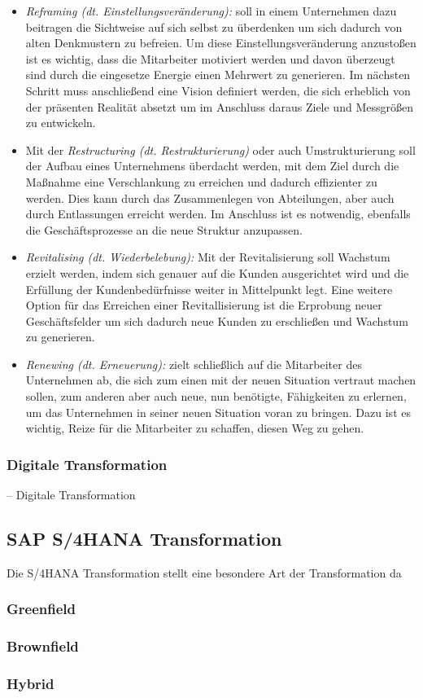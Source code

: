 \begin{itemize}
    \item[] \emph{Reframing (dt. Einstellungsveränderung):} soll in einem Unternehmen dazu beitragen die Sichtweise auf sich selbst zu überdenken um sich dadurch von alten Denkmustern zu befreien. Um diese Einstellungsveränderung anzustoßen ist es wichtig, dass die Mitarbeiter motiviert werden und davon überzeugt sind durch die eingesetze Energie einen Mehrwert zu generieren. Im nächsten Schritt muss anschließend eine Vision definiert werden, die sich erheblich von der präsenten Realität absetzt um im Anschluss daraus Ziele und Messgrößen zu entwickeln. 
    \item[] Mit der \emph{Restructuring (dt. Restrukturierung)} oder auch Umstrukturierung soll der Aufbau eines Unternehmens überdacht werden, mit dem Ziel durch die Maßnahme eine Verschlankung zu erreichen und dadurch effizienter zu werden. Dies kann durch das Zusammenlegen von Abteilungen, aber auch durch Entlassungen erreicht werden. Im Anschluss ist es notwendig, ebenfalls die Geschäftsprozesse an die neue Struktur anzupassen.   
    \item[] \emph{Revitalising (dt. Wiederbelebung):} Mit der Revitalisierung soll Wachstum erzielt werden, indem sich genauer auf die Kunden ausgerichtet wird und die Erfüllung der Kundenbedürfnisse weiter in Mittelpunkt legt. Eine weitere Option für das Erreichen einer Revitallisierung ist die Erprobung neuer Geschäftsfelder um sich dadurch neue Kunden zu erschließen und Wachstum zu generieren.
    \item[] \emph{Renewing (dt. Erneuerung):} zielt schließlich auf die Mitarbeiter des Unternehmen ab, die sich zum einen mit der neuen Situation vertraut machen sollen, zum anderen aber auch neue, nun benötigte, Fähigkeiten zu erlernen, um das Unternehmen in seiner neuen Situation voran zu bringen. Dazu ist es wichtig, Reize für die Mitarbeiter zu schaffen, diesen Weg zu gehen.
\end{itemize}

\subsubsection{Digitale Transformation}
-- Digitale Transformation

\subsection{SAP S/4HANA Transformation}
Die S/4HANA Transformation stellt eine besondere Art der Transformation da
\subsubsection{Greenfield}
\subsubsection{Brownfield}
\subsubsection{Hybrid}

